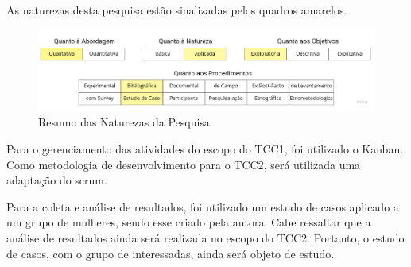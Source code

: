 As naturezas desta pesquisa estão sinalizadas pelos quadros amarelos.

\begin{figure}[ht]
	\centering
	\includegraphics[keepaspectratio=true,scale=0.3]{figuras/resumoAbordagem.pdf}
	\caption{Resumo das Naturezas da Pesquisa}
        \label{fig06}
\end{figure}

Para o gerenciamento das atividades do escopo do TCC1, foi utilizado o Kanban. Como metodologia de desenvolvimento para o TCC2, será utilizada uma adaptação do scrum.

Para a coleta e análise de resultados, foi utilizado um estudo 
de casos aplicado a um grupo de mulheres, sendo esse criado pela 
autora. Cabe ressaltar que a análise de resultados ainda será 
realizada no escopo do TCC2. Portanto, o estudo de casos, com o 
grupo de interessadas, ainda será objeto de estudo.



          

